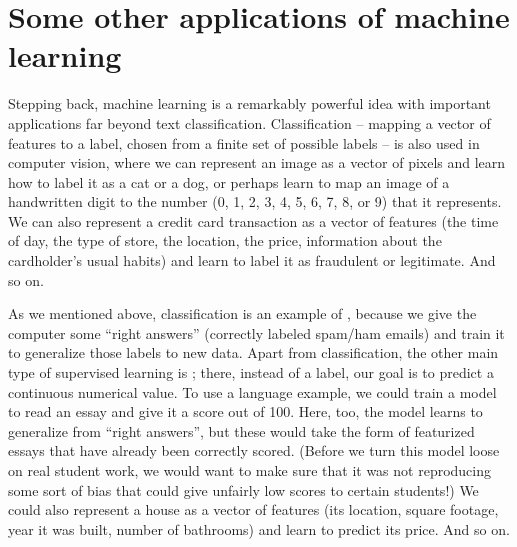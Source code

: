 \section{Some other applications  of machine learning}

Stepping back, machine learning is a remarkably powerful idea with important applications far beyond text classification.  Classification -- mapping a vector of features to a label, chosen from a finite set of possible labels -- is also used in computer vision, where we can represent an image as a vector of pixels and learn how to label it as a cat or a dog, or perhaps learn to map an image of a handwritten digit to the number (0, 1, 2, 3, 4, 5, 6, 7, 8, or 9) that it represents.  We can also represent a credit card transaction as a vector of features (the time of day, the type of store, the location, the price, information about the cardholder's usual habits) and learn to label it as fraudulent or legitimate.  And so on.

As we mentioned above, classification is an example of , because we give the computer some ``right answers'' (correctly labeled spam/ham emails) and train it to generalize those labels to new data.  Apart from classification, the other main type of supervised learning is ; there, instead of a label, our goal is to predict a continuous numerical value. To use a language example, we could train a model to read an essay and give it a score out of 100.  Here, too, the model learns to generalize from ``right answers'', but these would take the form of featurized essays that have already been correctly scored.  (Before we turn this model loose on real student work, we would want to make sure that it was not reproducing some sort of bias that could give unfairly low scores to certain students!)  We could also represent a house as a vector of features (its location, square footage, year it was built, number of bathrooms) and learn to predict its price.  And so on.

